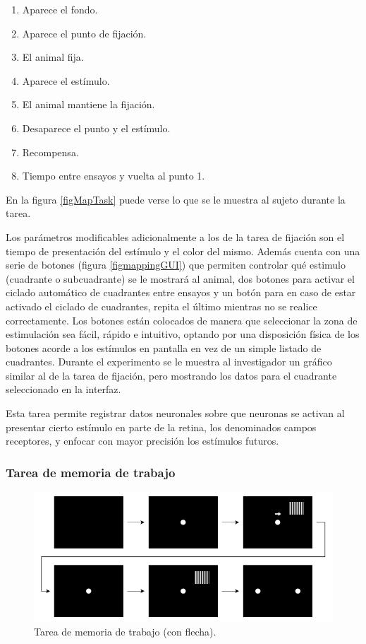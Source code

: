 \documentclass[conference]{IEEEtran}
\begin{document}
\begin{enumerate}
	\item Aparece el fondo.
	\item Aparece el punto de fijación.
	\item El animal fija.
	\item Aparece el estímulo.
	\item El animal mantiene la fijación.
	\item Desaparece el punto y el estímulo.
	\item Recompensa.
	\item Tiempo entre ensayos y vuelta al punto 1.
\end{enumerate}


En la figura \ref{figMapTask} puede verse lo que se le muestra al sujeto durante la tarea. 



Los parámetros modificables adicionalmente a los de la tarea de fijación son el tiempo de presentación del estímulo y el color del mismo. Además cuenta con una serie de botones (figura \ref{figmappingGUI}) que permiten controlar qué estimulo (cuadrante o subcuadrante) se le mostrará al animal, dos botones para activar el ciclado automático de cuadrantes entre ensayos y un botón para en caso de estar activado el ciclado de cuadrantes, repita el último mientras no se realice correctamente.
Los botones están colocados de manera que seleccionar la zona de estimulación sea fácil, rápido e intuitivo, optando por una disposición física de los botones acorde a los estímulos en pantalla en vez de un simple listado de cuadrantes.
Durante el experimento se le muestra al investigador un gráfico similar al de la tarea de fijación, pero mostrando los datos para el cuadrante seleccionado en la interfaz.


Esta tarea permite registrar datos neuronales sobre que neuronas se activan al presentar cierto estímulo en parte de la retina, los denominados campos receptores,  y enfocar con mayor precisión los estímulos futuros.


\subsubsection*{Tarea de memoria de trabajo}

\begin{figure}[bp]
\centerline{\includegraphics[width=\linewidth]{figures/memory_task}}
\caption{Tarea de memoria de trabajo (con flecha).}
\label{figMemoryTask}
\end{figure}
\end{document}
